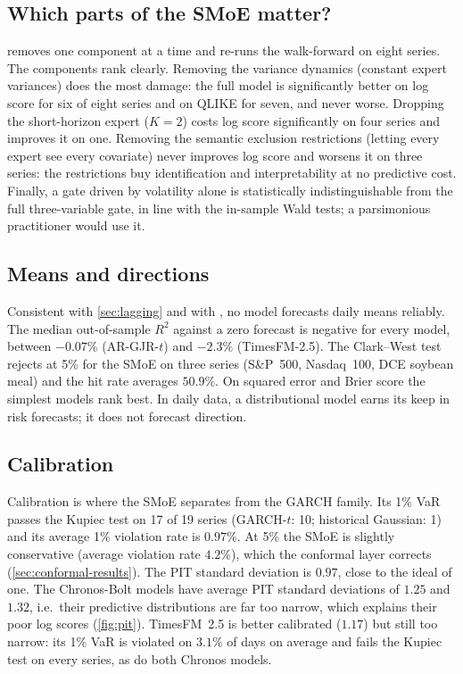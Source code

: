 \subsection{Which parts of the SMoE matter?}
 removes one component at a time and re-runs the walk-forward on eight series.
The components rank clearly. Removing the variance dynamics (constant expert variances) does the most
damage: the full model is significantly better on log score for six of eight
series and on QLIKE for seven, and never worse. Dropping the short-horizon expert ($K=2$) costs log
score significantly on four series and improves it on one. Removing the semantic exclusion restrictions (letting every expert see every
covariate) never improves log score and worsens it on three series: the restrictions buy
identification and interpretability at no predictive cost. Finally, a gate driven by volatility alone
is statistically indistinguishable from the full three-variable gate, in line with the in-sample Wald
tests; a parsimonious practitioner would use it.



\subsection{Means and directions}
Consistent with \cref{sec:lagging} and with \citet{welch2008comprehensive}, no model forecasts daily
means reliably. The median out-of-sample $R^2$ against a zero forecast is negative for every model,
between $-0.07\%$ (AR-GJR-$t$) and $-2.3\%$ (TimesFM-2.5). The Clark--West test rejects at 5\% for the SMoE on three series (S\&P~500,
Nasdaq~100, DCE soybean meal) and the hit rate averages $50.9\%$. On squared error and Brier score the
simplest models rank best. In daily data, a distributional model earns its keep in risk forecasts;
it does not forecast direction.


\subsection{Calibration}
Calibration is where the SMoE separates from the GARCH family. Its 1\% VaR passes the Kupiec test on
17 of 19 series (GARCH-$t$: 10; historical Gaussian: 1) and its average 1\% violation rate is
$0.97\%$. At 5\% the SMoE is slightly conservative (average violation rate $4.2\%$), which the
conformal layer corrects (\cref{sec:conformal-results}). The PIT standard deviation is $0.97$, close to
the ideal of one. The Chronos-Bolt models have average PIT standard deviations of $1.25$ and $1.32$,
i.e.\ their predictive distributions are far too narrow, which explains their poor log scores
(\cref{fig:pit}). TimesFM~2.5 is better calibrated ($1.17$) but still too narrow: its 1\% VaR is
violated on $3.1\%$ of days on average and fails the Kupiec test on every series, as do both
Chronos models.


